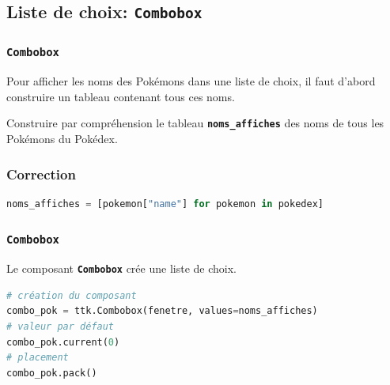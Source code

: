 \documentclass[svgnames,11pt]{beamer}
\begin{document}
\subsection{Liste de choix: \textbf{\texttt{Combobox}}}
\begin{frame}
    \frametitle{\textbf{\texttt{Combobox}}}

Pour afficher les noms des Pokémons dans une liste de choix, il faut d'abord construire un tableau contenant tous ces noms.
\begin{activite}
Construire par compréhension le tableau \textbf{\texttt{noms\_affiches}} des noms de tous les Pokémons du Pokédex.
\end{activite}

\end{frame}
\begin{frame}[fragile]
    \frametitle{Correction}

\begin{center}
\begin{lstlisting}[language=Python , basicstyle=\ttfamily\small, xleftmargin=.2em, xrightmargin=-3em]
noms_affiches = [pokemon["name"] for pokemon in pokedex]
\end{lstlisting}
\label{CODE}
\end{center}  

\end{frame}
\begin{frame}[fragile]
    \frametitle{\textbf{\texttt{Combobox}}}

    Le composant \textbf{\texttt{Combobox}} crée une liste de choix.
    \begin{center}
        \begin{lstlisting}[language=Python , basicstyle=\ttfamily\small, xleftmargin=.3em, xrightmargin=-2em]
# création du composant
combo_pok = ttk.Combobox(fenetre, values=noms_affiches)
# valeur par défaut
combo_pok.current(0)
# placement
combo_pok.pack()   
\end{lstlisting}
        \label{CODE}
    \end{center}

\end{frame}
\end{document}
